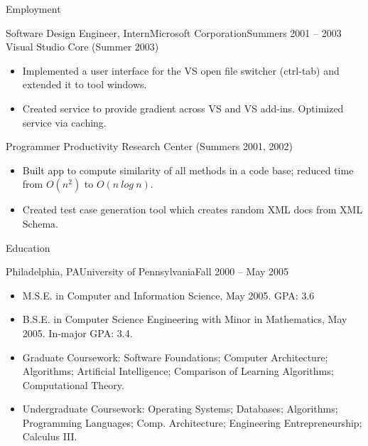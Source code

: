 \documentclass[]{mcdowellcv_updated}
\begin{document}
\begin{cvsection}{Employment}
		\begin{cvsubsection}{Software Design Engineer, Intern}{Microsoft Corporation}{Summers 2001 -- 2003}
			Visual Studio Core (Summer 2003)		
			\begin{itemize}
				\item Implemented a user interface for the VS open file switcher (ctrl-tab) and extended it to tool windows.
				\item Created service to provide gradient across VS and VS add-ins. Optimized service via caching.
			\end{itemize}
			Programmer Productivity Research Center (Summers 2001, 2002)
			\begin{itemize}
				\item Built app to compute similarity of all methods in a code base; reduced time from $O(n^2)$ to $O(n\ log\ n)$. 
				\item Created test case generation tool which creates random XML docs from XML Schema.
			\end{itemize}
		\end{cvsubsection}
	\end{cvsection}
	
	\begin{cvsection}{Education}
		\begin{cvsubsection}{Philadelphia, PA}{University of Pennsylvania}{Fall 2000 -- May 2005}
			\begin{itemize}
				\item M.S.E. in Computer and Information Science, May 2005. GPA: 3.6
				\item B.S.E. in Computer Science Engineering with Minor in Mathematics, May 2005.  In-major GPA: 3.4.
				\item Graduate Coursework: Software Foundations; Computer Architecture; Algorithms; Artificial Intelligence; Comparison of Learning Algorithms; Computational Theory.
				\item Undergraduate Coursework: Operating Systems; Databases; Algorithms; Programming Languages; Comp. Architecture; Engineering Entrepreneurship; Calculus III.
			\end{itemize}
		\end{cvsubsection}
	\end{cvsection}
	
\end{document}
